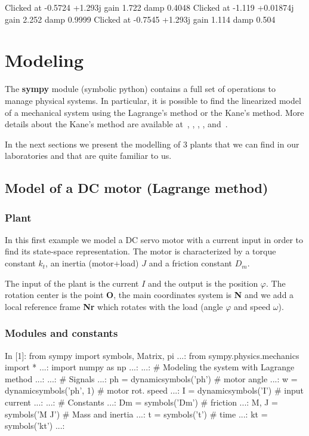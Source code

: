 \begin{code}
Clicked at    -0.5724    +1.293j gain      1.722 damp     0.4048
Clicked at     -1.119  +0.01874j gain      2.252 damp     0.9999
Clicked at    -0.7545    +1.293j gain      1.114 damp      0.504
\end{code}

\chapter{Modeling}
The \textbf{sympy} module (symbolic python) contains a full set of operations 
to manage physical systems.
In particular,  it is possible to find the linearized model of a 
mechanical system using the Lagrange's method or the Kane's method.
More details about the Kane's method are available at~\cite{KANE1}, 
\cite{KANE2}, \cite{KANE6}, \cite{KANE3}, \cite{KANE4} and~\cite{KANE5}.

In the next sections we present the modelling of 3 plants that we can find in 
our laboratories and that are quite familiar to us.

\section{Model of a DC motor (Lagrange method)} 
\subsection{Plant}
In this first example we model a DC servo motor with a current input in order 
to find its state-space representation. The motor is characterized by a torque 
constant $k_t$, an inertia (motor+load) $J$ and a friction constant $D_m$.

The input of the plant is the current $I$ and the output is the position 
$\varphi$. The rotation center is the point \textbf{O}, the main coordinates 
system is \textbf{N} and we add a local reference frame \textbf{Nr} which 
rotates with the load (angle $\varphi$ and speed $\omega$).

\subsection{Modules and constants}
\begin{code}
In [1]: from sympy import symbols, Matrix, pi
   ...: from sympy.physics.mechanics import *
   ...: import numpy as np
   ...: 
   ...: # Modeling the system with Lagrange method
   ...: 
   ...: # Signals
   ...: ph = dynamicsymbols('ph')    # motor angle
   ...: w  = dynamicsymbols('ph', 1)     # motor rot. speed
   ...: I  = dynamicsymbols('I')     # input current
   ...: 
   ...: # Constants
   ...: Dm = symbols('Dm')           # friction
   ...: M, J = symbols('M J')        # Mass and inertia
   ...: t = symbols('t')             # time
   ...: kt  = symbols('kt')
   ...: 
\end{code}

